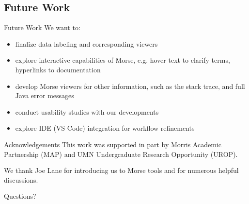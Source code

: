 \documentclass{beamer}
\begin{document}
\subsection{Future Work}
\begin{frame}{Future Work}
  We want to:
  \begin{itemize}
    \item finalize data labeling and corresponding viewers
    \item explore interactive capabilities of Morse, e.g. hover text to clarify terms, hyperlinks to documentation
    \item develop Morse viewers for other information, such as the stack trace, and full Java error messages
    \item conduct usability studies with our developments
    \item explore IDE (VS Code) integration for workflow refinements
  \end{itemize}
  \end{frame}

\begin{frame}{Acknowledgements}
This work was supported in part by Morris Academic Partnership (MAP) and UMN Undergraduate Research Opportunity (UROP).  \\ 

\vspace*{0.2in}

We thank Joe Lane for introducing us to Morse tools and for numerous helpful discussions.

\begin{centering}
  Questions?
\end{centering}

\end{frame}
\end{document}
